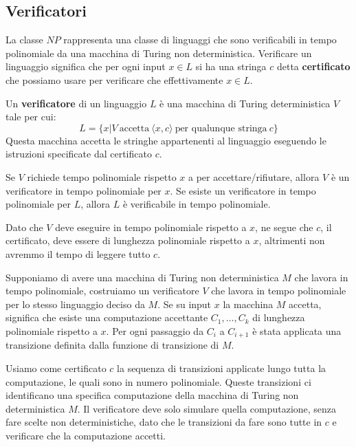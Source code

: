 \subsection{Verificatori}
La classe $NP$ rappresenta una classe di linguaggi che sono verificabili in
tempo polinomiale da una macchina di Turing non deterministica. Verificare un
linguaggio significa che per ogni input $x \in L$ si ha una stringa $c$ detta
\textbf{certificato} che possiamo usare per verificare che effettivamente $x \in
    L$.
\begin{definizione}
    Un \textbf{verificatore} di un linguaggio $L$ è una macchina di Turing
    deterministica $V$ tale per cui:
    \begin{equation}
        L = \{x | V \ \text{accetta} \ \langle x, c \rangle \
        \text{per qualunque stringa} \ c\}
    \end{equation}
    Questa macchina accetta le stringhe appartenenti al linguaggio eseguendo le
    istruzioni specificate dal certificato $c$.
\end{definizione}
Se $V$ richiede tempo polinomiale rispetto $x$ a per accettare/rifiutare, allora
$V$ è un verificatore in tempo polinomiale per $x$. Se esiste un verificatore in
tempo polinomiale per $L$, allora $L$ è verificabile in tempo polinomiale.

Dato che $V$ deve eseguire in tempo polinomiale rispetto a $x$, ne segue che $c$,
il certificato, deve essere di lunghezza polinomiale rispetto a $x$, altrimenti
non avremmo il tempo di leggere tutto $c$.

Supponiamo di avere una macchina di Turing non deterministica $M$ che lavora in
tempo polinomiale, costruiamo un verificatore $V$ che lavora in tempo polinomiale
per lo stesso linguaggio deciso da $M$. Se su input $x$ la macchina $M$ accetta,
significa che esiste una computazione accettante $C_1, \dots, C_k$ di lunghezza
polinomiale rispetto a $x$. Per ogni passaggio da $C_i$ a $C_{i + 1}$ è stata
applicata una transizione definita dalla funzione di transizione di $M$.

Usiamo come certificato $c$ la sequenza di transizioni applicate lungo tutta la
computazione, le quali sono in numero polinomiale. Queste transizioni ci
identificano una specifica computazione della macchina di Turing non
deterministica $M$. Il verificatore deve solo simulare quella computazione, senza
fare scelte non deterministiche, dato che le transizioni da fare sono tutte in
$c$ e verificare che la computazione accetti.

